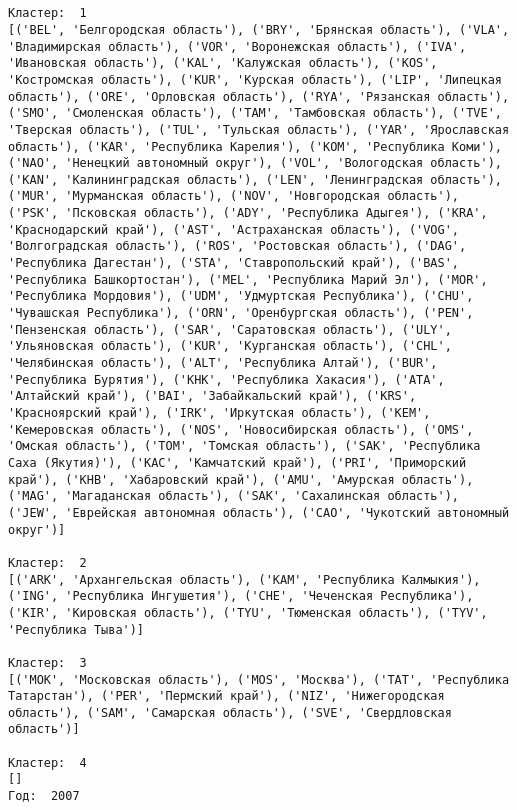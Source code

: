 \documentclass[11pt]{article}
\begin{document}
    \begin{center}
    \end{center}
    { \hspace*{\fill} \\}
    
    \begin{Verbatim}[commandchars=\\\{\}]

Кластер:  1
[('BEL', 'Белгородская область'), ('BRY', 'Брянская область'), ('VLA', 'Владимирская область'), ('VOR', 'Воронежская область'), ('IVA', 'Ивановская область'), ('KAL', 'Калужская область'), ('KOS', 'Костромская область'), ('KUR', 'Курская область'), ('LIP', 'Липецкая область'), ('ORE', 'Орловская область'), ('RYA', 'Рязанская область'), ('SMO', 'Смоленская область'), ('TAM', 'Тамбовская область'), ('TVE', 'Тверская область'), ('TUL', 'Тульская область'), ('YAR', 'Ярославская область'), ('KAR', 'Республика Карелия'), ('KOM', 'Республика Коми'), ('NAO', 'Ненецкий автономный округ'), ('VOL', 'Вологодская область'), ('KAN', 'Калинингpадская область'), ('LEN', 'Ленинградская область'), ('MUR', 'Мурманская область'), ('NOV', 'Новгородская область'), ('PSK', 'Псковская область'), ('ADY', 'Республика Адыгея'), ('KRA', 'Краснодарский край'), ('AST', 'Астраханская область'), ('VOG', 'Волгоградская область'), ('ROS', 'Ростовская область'), ('DAG', 'Республика Дагестан'), ('STA', 'Ставропольский край'), ('BAS', 'Республика Башкортостан'), ('MEL', 'Республика Марий Эл'), ('MOR', 'Республика Мордовия'), ('UDM', 'Удмуртская Республика'), ('CHU', 'Чувашская Республика'), ('ORN', 'Оренбургская область'), ('PEN', 'Пензенская область'), ('SAR', 'Саратовская область'), ('ULY', 'Ульяновская область'), ('KUR', 'Курганская область'), ('CHL', 'Челябинская область'), ('ALT', 'Республика Алтай'), ('BUR', 'Республика Бурятия'), ('KHK', 'Республика Хакасия'), ('ATA', 'Алтайский край'), ('BAI', 'Забайкальский край'), ('KRS', 'Красноярский край'), ('IRK', 'Иркутская область'), ('KEM', 'Кемеровская область'), ('NOS', 'Новосибирская область'), ('OMS', 'Омская область'), ('TOM', 'Томская область'), ('SAK', 'Республика Саха (Якутия)'), ('KAC', 'Камчатский край'), ('PRI', 'Приморский край'), ('KHB', 'Хабаровский край'), ('AMU', 'Амурская область'), ('MAG', 'Магаданская область'), ('SAK', 'Сахалинская область'), ('JEW', 'Еврейская автономная область'), ('CAO', 'Чукотский автономный округ')]

Кластер:  2
[('ARK', 'Архангельская область'), ('KAM', 'Республика Калмыкия'), ('ING', 'Республика Ингушетия'), ('CHE', 'Чеченская Республика'), ('KIR', 'Кировская область'), ('TYU', 'Тюменская область'), ('TYV', 'Республика Тыва')]

Кластер:  3
[('MOK', 'Московская область'), ('MOS', 'Москва'), ('TAT', 'Республика Татарстан'), ('PER', 'Пермский край'), ('NIZ', 'Нижегородская область'), ('SAM', 'Самарская область'), ('SVE', 'Свердловская область')]

Кластер:  4
[]
Год:  2007

    \end{Verbatim}
\end{document}
